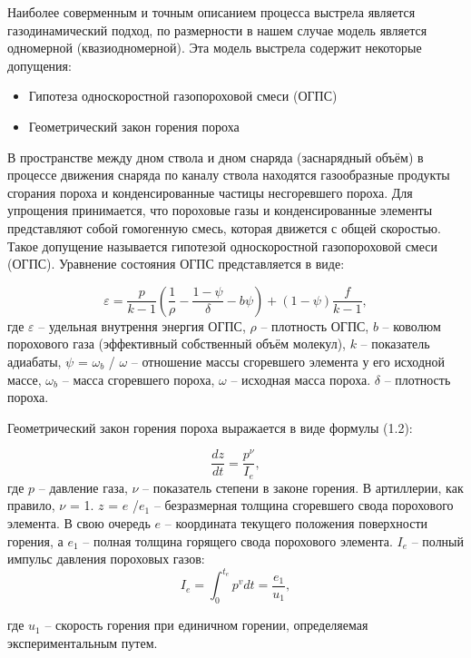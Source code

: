 \documentclass[14pt, a4paper]{extreport} %
\begin{document}
Наиболее соверменным и точным описанием процесса выстрела является газодинамический подход, 
по размерности в нашем случае модель является одномерной (квазиодномерной). Эта модель выстрела содержит некоторые допущения: 
\begin{itemize}
    \item Гипотеза односкоростной газопороховой смеси (ОГПС)
    \item Геометрический закон горения пороха
\end{itemize}


    В пространстве между дном ствола и дном снаряда (заснарядный объём) в процессе движения снаряда 
по каналу ствола находятся газообразные продукты сгорания пороха и конденсированные частицы несгоревшего пороха.
Для упрощения принимается, что пороховые газы и конденсированные элементы представляют собой гомогенную смесь, которая движется 
с общей скоростью. Такое допущение называется гипотезой односкоростной газопороховой смеси (ОГПС). Уравнение состояния ОГПС представляется в виде: 

\begin{equation}
\varepsilon = \frac{p}{k - 1} \left( \frac{1}{\rho} - \frac{1 - \psi}{\delta} - b \psi \right) + (1 - \psi) \frac{f}{k - 1},
\label{eq:epsilon}
\end{equation}
где $\varepsilon$ -- удельная внутрення энергия ОГПС, $\rho$ -- плотность ОГПС, $b$ -- коволюм порохового газа (эффективный собственный объём молекул), $k$ -- показатель адиабаты, 
$\psi$ = $\omega_b$ / $\omega$ -- отношение массы сгоревшего элемента у его исходной массе, $\omega_b$ -- масса сгоревшего пороха, $\omega$ -- исходная масса пороха. $\delta$ -- плотность пороха. 

Геометрический закон горения пороха выражается в виде формулы (1.2): 

\begin{equation}
\frac{dz}{dt} = \frac{p^\nu}{I_e}, 
\label{eq:1}
\end{equation}
где  $p$ -- давление газа, $\nu$ -- показатель степени
в законе горения. В артиллерии, как правило, $\nu$ = 1. $z$ = $e$ /$e_1$ -- безразмерная толщина сгоревшего свода порохового элемента. В свою очередь
$e$ -- координата текущего положения поверхности горения, а $e_1$ -- полная толщина горящего свода порохового элемента. $I_e$ -- полный импульс давления пороховых газов:
\[
I_e = \int_0^{t_e} p^v  dt = \frac{e_1}{u_1},
\]

где $u_1$ -- скорость горения при единичном горении, определяемая экспериментальным путем.
\end{document}
